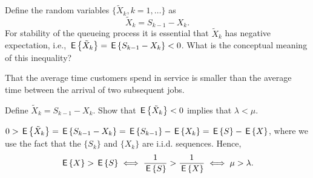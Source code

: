 \begin{question} 
Define the random variables $\{\tilde X_k,k=1,\ldots\}$ as
  \begin{equation*}
    \tilde X_k = S_{k-1}-X_k.
  \end{equation*}
  For stability of the queueing process it is essential that
  $\tilde X_k$ has negative expectation, i.e.,
  $\,\mathsf{E}\left\{\tilde X_k\right\} = \,\mathsf{E}\left\{S_{k-1}-X_k\right\} < 0$.  What is the conceptual
  meaning of this inequality?
  \begin{solution}
 That the average time customers spend in service is smaller
      than the average time between the arrival of two subsequent
      jobs. 
  \end{solution}
\end{question}

\begin{question} 
Define $\tilde X_k = S_{k-1}-X_k$.
 Show that $\,\mathsf{E}\left\{\tilde X_k\right\} <0$ implies that $\lambda<\mu$. 
 \begin{hint}
   
 \end{hint}
  \begin{solution}
  $0> \,\mathsf{E}\left\{\tilde X_k\right\} = \,\mathsf{E}\left\{S_{k-1}-X_k\right\} =  \,\mathsf{E}\left\{ S_{k-1}\right\}- \,\mathsf{E}\left\{X_k\right\} = \,\mathsf{E}\left\{S\right\} - \,\mathsf{E}\left\{X\right\}$, where we use the fact that the $\{S_k\}$ and $\{X_k\}$ are i.i.d. sequences. Hence, 
  \begin{equation*}
    \,\mathsf{E}\left\{X\right\} > \,\mathsf{E}\left\{S\right\} \iff \frac 1{\,\mathsf{E}\left\{S\right\}} > \frac1{\,\mathsf{E}\left\{X\right\}} \iff \mu > \lambda.
  \end{equation*}

  \end{solution}
\end{question}


